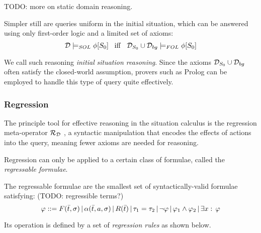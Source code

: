 TODO: more on static domain reasoning.

Simpler still are queries uniform in the initial situation, which
can be answered using only first-order logic and a limited set of
axioms:\[
\mathcal{D}\models_{SOL}\phi[S_{0}]\,\,\,\,\,\mathit{\mathrm{iff}}\,\,\,\,\,\mathcal{D}_{S_{0}}\cup\mathcal{D}_{bg}\models_{FOL}\phi[S_{0}]\]


We call such reasoning \emph{initial} \emph{situation reasoning}.
Since the axioms $\mathcal{D}_{S_{0}}\cup\mathcal{D}_{bg}$ often satisfy the closed-world
assumption, provers such as Prolog can be employed to handle this
type of query quite effectively.


\subsubsection{Regression}

The principle tool for effective reasoning in the situation calculus
is the regression meta-operator $\mathcal{R}_{\mathcal{D}}$ \citep{pirri99contributions_sitcalc},
a syntactic manipulation that encodes the effects of actions into
the query, meaning fewer axioms are needed for reasoning.

Regression can only be applied to a certain class of formulae, called
the \emph{regressable formulae}.

\begin{defnL}
 The regressable formulae are the
smallest set of syntactically-valid formulae satisfying: (TODO: regressible
terms?)\[
\varphi::=F(\bar{t},\sigma)\,|\,\alpha(\bar{t},a,\sigma)\,|\, R(\bar{t})\,|\,\tau_{1}=\tau_{2}\,|\,\neg\varphi\,|\,\varphi_{1}\wedge\varphi_{2}\,|\,\exists x:\,\varphi\]

\end{defnL}
Its operation is defined by a set of \emph{regression rules} as shown
below.

